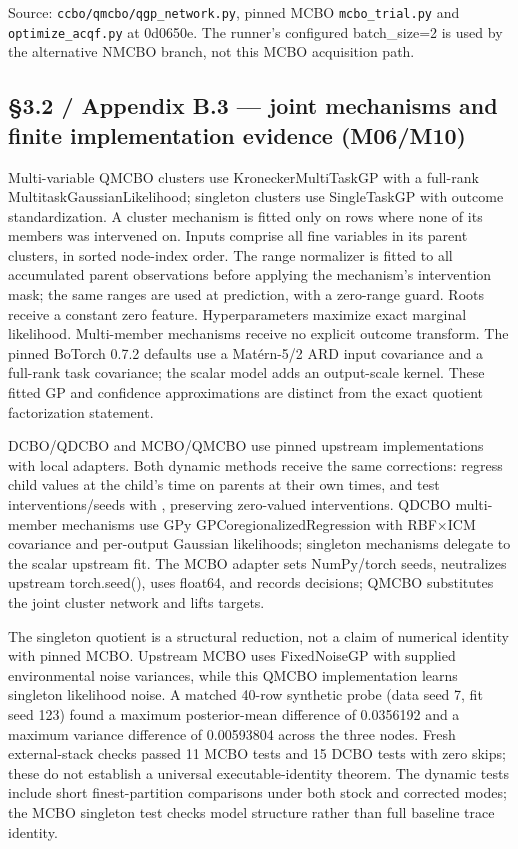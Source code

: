 Source: \nolinkurl{ccbo/qmcbo/qgp_network.py}, pinned MCBO \nolinkurl{mcbo_trial.py} and \nolinkurl{optimize_acqf.py} at 0d0650e. The runner's configured batch\_size=2 is used by the alternative NMCBO branch, not this MCBO acquisition path.

\subsection*{\S{}3.2 / Appendix B.3 --- joint mechanisms and finite implementation evidence (M06/M10)}

Multi-variable QMCBO clusters use KroneckerMultiTaskGP with a full-rank MultitaskGaussianLikelihood; singleton clusters use SingleTaskGP with outcome standardization. A cluster mechanism is fitted only on rows where none of its members was intervened on. Inputs comprise all fine variables in its parent clusters, in sorted node-index order. The range normalizer is fitted to all accumulated parent observations before applying the mechanism's intervention mask; the same ranges are used at prediction, with a zero-range guard. Roots receive a constant zero feature. Hyperparameters maximize exact marginal likelihood. Multi-member mechanisms receive no explicit outcome transform. The pinned BoTorch 0.7.2 defaults use a Matérn-5/2 ARD input covariance and a full-rank task covariance; the scalar model adds an output-scale kernel. These fitted GP and confidence approximations are distinct from the exact quotient factorization statement.

DCBO/QDCBO and MCBO/QMCBO use pinned upstream implementations with local adapters. Both dynamic methods receive the same corrections: regress child values at the child's time on parents at their own times, and test interventions/seeds with \texttt{}, preserving zero-valued interventions. QDCBO multi-member mechanisms use GPy GPCoregionalizedRegression with RBF\ensuremath{\times}ICM covariance and per-output Gaussian likelihoods; singleton mechanisms delegate to the scalar upstream fit. The MCBO adapter sets NumPy/torch seeds, neutralizes upstream torch.seed(), uses float64, and records decisions; QMCBO substitutes the joint cluster network and lifts targets.

The singleton quotient is a structural reduction, not a claim of numerical identity with pinned MCBO. Upstream MCBO uses FixedNoiseGP with supplied environmental noise variances, while this QMCBO implementation learns singleton likelihood noise. A matched 40-row synthetic probe (data seed 7, fit seed 123) found a maximum posterior-mean difference of 0.0356192 and a maximum variance difference of 0.00593804 across the three nodes. Fresh external-stack checks passed 11 MCBO tests and 15 DCBO tests with zero skips; these do not establish a universal executable-identity theorem. The dynamic tests include short finest-partition comparisons under both stock and corrected modes; the MCBO singleton test checks model structure rather than full baseline trace identity.

